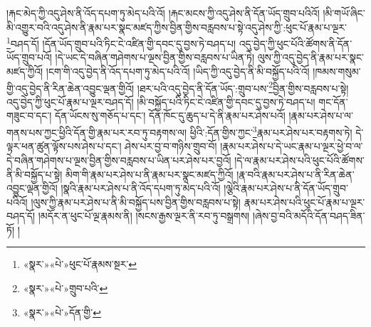།རྐང་མེད་ཀྱི་འདུ་ཤེས་ནི་འོད་དཔག་ཏུ་མེད་པའི་འོ། །རྐང་མངས་ཀྱི་འདུ་ཤེས་ནི་དོན་ཡོད་གྲུབ་པའིའོ། །མི་གཡོ་ཞིང་མི་འགྱུར་བའི་འདུ་ཤེས་ནི་རྣམ་པར་སྣང་མཛད་ཀྱིས་བྱིན་གྱིས་བརླབས་པ་སྟེ་འདུ་ཤེས་ཀྱི་:ཕུང་པོ་རྣམ་པ་ལྔར་\footnote{«སྣར་»«པེ་»ཕུང་པོ་རྣམས་སྔར་}བཤད་དོ། །དོན་ཡོད་གྲུབ་པའི་ཏིང་ངེ་འཛིན་གྱི་དབང་དུ་བྱས་ཏེ་བཤད་པ། འདུ་བྱེད་ཀྱི་ཕུང་པོའི་ཚོགས་ནི་དོན་ཡོད་གྲུབ་པའོ། །དེ་ཡང་དེ་བཞིན་གཤེགས་པ་ལྔས་བྱིན་གྱིས་བརླབས་པ་ཡིན་ཏེ། ལུས་ཀྱི་འདུ་བྱེད་ནི་རྣམ་པར་སྣང་མཛད་ཀྱིའོ། །ངག་གི་འདུ་བྱེད་ནི་འོད་དཔག་ཏུ་མེད་པའི་འོ། །ཡིད་ཀྱི་འདུ་བྱེད་ནི་མི་བསྐྱོད་པའི་འོ། །ཁམས་གསུམ་གྱི་འདུ་བྱེད་ནི་རིན་ཆེན་འབྱུང་ལྡན་གྱིའོ། །ཐར་པའི་འདུ་བྱེད་ནི་དོན་ཡོད་:གྲུབ་པས་\footnote{«སྣར་»«པེ་»གྲུབ་པའི་}བྱིན་གྱིས་བརླབས་པ་སྟེ། འདུ་བྱེད་ཀྱི་ཕུང་པོ་རྣམ་པ་ལྔར་བཤད་དོ། །མི་བསྐྱོད་པའི་ཏིང་ངེ་འཛིན་གྱི་དབང་དུ་བྱས་ཏེ་བཤད་པ། གང་དོན་གཟུང་བ་དང་། དོན་ཡོངས་སུ་གཅོད་པ་དང་། དོན་ཁོང་དུ་ཆུད་པ་དེ་ནི་རྣམ་པར་ཤེས་པའོ། །རྣམ་པར་ཤེས་པ་ལ་གནས་པས་ཀྱང་ཕྱིའི་དོན་གྱི་རྣམ་པར་རབ་ཏུ་བརྟགས་ལ། ཕྱིའི་:དོན་གྱིས་ཀྱང་\footnote{«སྣར་»«པེ་»དོན་གྱི་}རྣམ་པར་ཤེས་པར་བརྟགས་ཏེ། དེ་ལྟར་ཕན་ཚུན་ལྟོས་པས་ཤེས་པ་དང་། ཤེས་པར་བྱ་བ་གཉིས་གྲུབ་བོ། །རྣམ་པར་ཤེས་པ་དེ་ཡང་རྣམ་པ་ལྔར་ཕྱེ་བ་ལ་དེ་བཞིན་གཤེགས་པ་ལྔས་བྱིན་གྱིས་བརླབས་པ་ཡིན་པར་ཤེས་པར་བྱའོ། །དེ་ལ་རྣམ་པར་ཤེས་པའི་ཕུང་པོའི་ཚོགས་ནི་མི་བསྐྱོད་པ་སྟེ། མིག་གི་རྣམ་པར་ཤེས་པ་ནི་རྣམ་པར་སྣང་མཛད་ཀྱིའོ། །རྣ་བའི་རྣམ་པར་ཤེས་པ་ནི་རིན་ཆེན་འབྱུང་ལྡན་གྱིའོ། །སྣའི་རྣམ་པར་ཤེས་པ་ནི་འོད་དཔག་ཏུ་མེད་པའི་འོ། །ལྕེའི་རྣམ་པར་ཤེས་པ་ནི་དོན་ཡོད་གྲུབ་པའིའོ། །ལུས་ཀྱི་རྣམ་པར་ཤེས་པ་ནི་མི་བསྐྱོད་པས་བྱིན་གྱིས་བརླབས་པ་སྟེ། རྣམ་པར་ཤེས་པའི་ཕུང་པོ་རྣམ་པ་ལྔར་བཤད་དོ། །མདོར་ན་ཕུང་པོ་ལྔ་རྣམས་ནི། །སངས་རྒྱས་ལྔར་ནི་རབ་ཏུ་བསྒྲགས། །ཞེས་བྱ་བའི་མདོའི་དོན་བཤད་ཟིན་ཏོ། །
